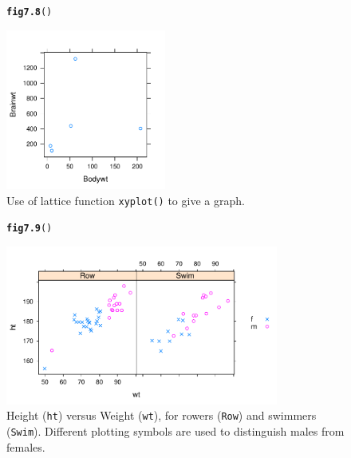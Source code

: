 \documentclass[12pt, a4paper,  BCOR=8.25mm, DIV=15]{scrartcl}\usepackage[]{graphicx}\usepackage[]{color}
\makeatletter
\newcommand{\hlstd}[1]{\textcolor[rgb]{0.345,0.345,0.345}{#1}}%
\newcommand{\hlkwd}[1]{\textcolor[rgb]{0.737,0.353,0.396}{\textbf{#1}}}%
\newenvironment{kframe}{%
 \def\at@end@of@kframe{}%
 \ifinner\ifhmode%
  \def\at@end@of@kframe{\end{minipage}}%
  \begin{minipage}{\columnwidth}%
 \fi\fi%
 \def\FrameCommand##1{\hskip\@totalleftmargin \hskip-\fboxsep
 \colorbox{shadecolor}{##1}\hskip-\fboxsep
     \hskip-\linewidth \hskip-\@totalleftmargin \hskip\columnwidth}%
 \MakeFramed {\advance\hsize-\width
   \@totalleftmargin\z@ \linewidth\hsize
   \@setminipage}}%
 {\par\unskip\endMakeFramed%
 \at@end@of@kframe}
\newenvironment{knitrout}{}{} %
\newcommand{\txtt}[1]{{\texttt{#1}}}
\makeatother
\begin{document}
\begin{figure}[ht]
\begin{knitrout}
\color{fgcolor}\begin{kframe}
\begin{alltt}
\hlkwd{fig7.8}\hlstd{()}
\end{alltt}
\end{kframe}

{\centering \includegraphics[width=0.47\textwidth]{figure/gph-fig7_8e-1} 

}



\end{knitrout}
\caption{Use of lattice function \txtt{xyplot()} to give a graph.
  \label{fig:lat-gph}}
\end{figure}

\begin{figure}[ht]
\begin{knitrout}
\color{fgcolor}\begin{kframe}
\begin{alltt}
\hlkwd{fig7.9}\hlstd{()}
\end{alltt}
\end{kframe}

{\centering \includegraphics[width=0.8\textwidth]{figure/gph-fig7_9e-1} 

}



\end{knitrout}
\caption{Height (\texttt{ht}) versus Weight (\texttt{wt}), for
        rowers (\texttt{Row}) and swimmers (\texttt{Swim}).
        Different plotting symbols are used to distinguish males from
        females.}\label{fig:lattice-ais}
\end{figure}
\end{document}
